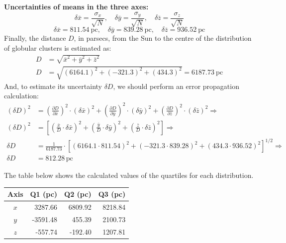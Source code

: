 \begin{description}
  \textbf{Uncertainties of means in the three axes:}
  \[
    \delta\bar{x} = \frac{\sigma_x}{\sqrt{N}},\quad
    \delta\bar{y} = \frac{\sigma_y}{\sqrt{N}},\quad
    \delta\bar{z} = \frac{\sigma_z}{\sqrt{N}}
  \]
  \[
    \delta\bar{x} = 811.54\ \mathrm{pc},\quad
    \delta\bar{y} = 839.28\ \mathrm{pc},\quad
    \delta\bar{z} = 936.52\ \mathrm{pc}
  \]
  Finally, the distance $D$, in parsecs, from the Sun to the centre of the
  distribution of globular clusters is estimated as:
  \begin{align*}
    D &= \sqrt{\bar{x}^2 + \bar{y}^2 + \bar{z}^2}\\
    D &= \sqrt{(6164.1)^2 + (-321.3)^2 + (434.3)^2} = 6187.73\ \mathrm{pc}
  \end{align*}
  And, to estimate its uncertainty $\delta D$, we should perform an error
  propagation calculation:
  \begin{align*}
    (\delta D)^2 &= \left(\frac{\partial D}{\partial\bar{x}}\right)^2
        \cdot(\delta\bar{x})^2
      + \left(\frac{\partial D}{\partial\bar{y}}\right)^2
        \cdot(\delta\bar{y})^2
      + \left(\frac{\partial D}{\partial\bar{z}}\right)^2
        \cdot(\delta\bar{z})^2 \Rightarrow\\
    (\delta D)^2 &= \left[
        \left(\frac{\bar{x}}{D}\cdot\delta\bar{x}\right)^2
      + \left(\frac{\bar{y}}{D}\cdot\delta\bar{y}\right)^2
      + \left(\frac{\bar{z}}{D}\cdot\delta\bar{z}\right)^2
      \right] \Rightarrow\\
    \delta D &= \frac{1}{6187.73}\cdot
      \left[(6164.1\cdot811.54)^2 + (-321.3\cdot839.28)^2
      + (434.3\cdot936.52)^2\right]^{1/2} \Rightarrow\\
    \delta D &= 812.28\,\mathrm{pc}
  \end{align*}
\item[(c)] The table below shows the calculated values of the quartiles for
  each distribution.

  \begin{center}
  \begin{tabular}{|c|r|r|r|}
  \hline
  \textbf{Axis} & \textbf{Q1 (pc)} & \textbf{Q2 (pc)} & \textbf{Q3 (pc)}\\
  \hline
  $x$ &  3287.66 & 6809.92 & 8218.84\\
  $y$ & -3591.48 &  455.39 & 2100.73\\
  $z$ &  -557.74 & -192.40 & 1207.81\\
  \hline
  \end{tabular}
  \end{center}


\end{description}
